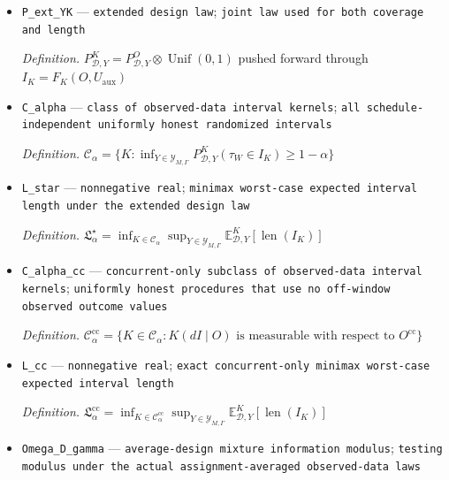 \documentclass{article}
\begin{document}
\begin{itemize}
  \par\smallskip\noindent\emph{Definition.} \(I_K=F_K(O,U_{\mathrm{aux}})\), where \(F_K\) is a measurable realization of \(K(dI\mid O)\)
  \item \texttt{P\_\allowbreak{}ext\_\allowbreak{}YK} --- \texttt{extended design law}; \texttt{joint law used for both coverage and length}
  \par\smallskip\noindent\emph{Definition.} \(P^{K}_{\mathcal D,Y}=P^{O}_{\mathcal D,Y}\otimes\operatorname{Unif}(0,1)\) pushed forward through \(I_K=F_K(O,U_{\mathrm{aux}})\)
  \item \texttt{C\_\allowbreak{}alpha} --- \texttt{class of observed-\allowbreak{}data interval kernels}; \texttt{all schedule-\allowbreak{}independent uniformly honest randomized intervals}
  \par\smallskip\noindent\emph{Definition.} \(\mathcal C_\alpha=\{K:\inf_{Y\in\mathcal Y_{M,\Gamma}}P^K_{\mathcal D,Y}(\tau_W\in I_K)\ge1-\alpha\}\)
  \item \texttt{L\_\allowbreak{}star} --- \texttt{nonnegative real}; \texttt{minimax worst-\allowbreak{}case expected interval length under the extended design law}
  \par\smallskip\noindent\emph{Definition.} \(\mathfrak L_\alpha^\star=\inf_{K\in\mathcal C_\alpha}\sup_{Y\in\mathcal Y_{M,\Gamma}}\mathbb E^K_{\mathcal D,Y}[\operatorname{len}(I_K)]\)
  \item \texttt{C\_\allowbreak{}alpha\_\allowbreak{}cc} --- \texttt{concurrent-\allowbreak{}only subclass of observed-\allowbreak{}data interval kernels}; \texttt{uniformly honest procedures that use no off-\allowbreak{}window observed outcome values}
  \par\smallskip\noindent\emph{Definition.} \(\mathcal C_\alpha^{\mathrm{cc}}=\{K\in\mathcal C_\alpha:K(dI\mid O)\text{ is measurable with respect to }O^{\mathrm{cc}}\}\)
  \item \texttt{L\_\allowbreak{}cc} --- \texttt{nonnegative real}; \texttt{exact concurrent-\allowbreak{}only minimax worst-\allowbreak{}case expected interval length}
  \par\smallskip\noindent\emph{Definition.} \(\mathfrak L_\alpha^{\mathrm{cc}}=\inf_{K\in\mathcal C_\alpha^{\mathrm{cc}}}\sup_{Y\in\mathcal Y_{M,\Gamma}}\mathbb E^K_{\mathcal D,Y}[\operatorname{len}(I_K)]\)
  \item \texttt{Omega\_\allowbreak{}D\_\allowbreak{}gamma} --- \texttt{average-\allowbreak{}design mixture information modulus}; \texttt{testing modulus under the actual assignment-\allowbreak{}averaged observed-\allowbreak{}data laws}

\end{itemize}
\end{document}
